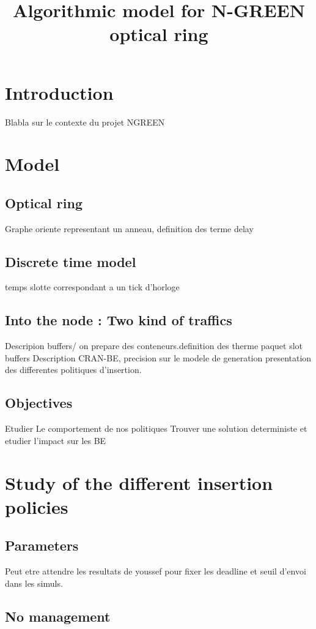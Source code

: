 \documentclass[a4paper,10pt]{article}
\title{Algorithmic model for N-GREEN optical ring}
\begin{document}
\maketitle
\section{Introduction}
Blabla sur le contexte du projet NGREEN



\section{Model}
  
  \subsection{Optical ring}
    Graphe oriente representant un anneau, definition des terme delay
  \subsection{Discrete time model}
    temps slotte correspondant a un tick d'horloge
  \subsection{Into the node : Two kind of traffics}
    Descripion buffers/ on prepare des conteneurs.definition des therme paquet slot buffers
    Description CRAN-BE, precision sur le modele de generation
    presentation des differentes politiques d'insertion.

  \subsection{Objectives}
    Etudier Le comportement de nos politiques
    Trouver une solution deterministe et etudier l'impact sur les BE
    
\section{Study of the different insertion policies}

  \subsection{Parameters}
  Peut etre attendre les resultats de youssef pour fixer les deadline et seuil d'envoi dans les simuls.
  \subsection{No management}
\end{document}
